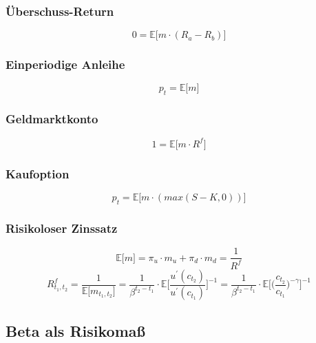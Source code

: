 \subsubsection{Überschuss-Return}
\begin{equation}
	0 = \mathbb{E} \big\lbrack m \cdot (R_a - R_b) \big\rbrack \label{eq:uer}
\end{equation}

\subsubsection{Einperiodige Anleihe}
\begin{equation}
	p_t = \mathbb{E} \big\lbrack m \big\rbrack \label{eq:an}
\end{equation}

\subsubsection{Geldmarktkonto}
\begin{equation}
	1 = \mathbb{E} \big\lbrack m \cdot R^f \big\rbrack \label{eq:gmk}
\end{equation}

\subsubsection{Kaufoption}
\begin{equation}
	p_t = \mathbb{E} \big\lbrack m \cdot (max(S-K,0)) \big\rbrack \label{eq:ko}
\end{equation}

\subsubsection{Risikoloser Zinssatz}
\begin{equation}
	\mathbb{E} \big\lbrack m \big\rbrack = \pi_u \cdot m_u + \pi_d \cdot m_d = \frac{1}{R^f} \label{eq:E}
\end{equation}
\begin{equation}
	R^f_{t_1, t_2} = \frac{1}{\mathbb{E} \big\lbrack m_{t_1,t_2} \big\rbrack} = \frac{1}{\beta^{t_2-t_1}} \cdot \mathbb{E} \Bigg\lbrack \frac{u^\prime(c_{t_2})}{u^\prime(c_{t_1})} \Bigg\rbrack^{-1} = \frac{1}{\beta^{t_2-t_1}} \cdot \mathbb{E} \Bigg\lbrack \bigg( \frac{c_{t_2}}{c_{t_1}} \bigg)^{-\gamma} \Bigg\rbrack^{-1} \label{eq:rf}
\end{equation}


\subsection{Beta als Risikomaß}

